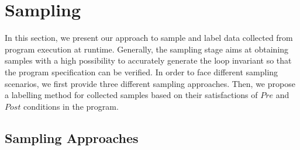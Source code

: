
\section{Sampling} %
\label{sec:sampling}

In this section, we present our approach to sample and label data 
collected from program execution at runtime. 
Generally, the sampling stage aims at obtaining samples with a high possibility to 
accurately generate the loop invariant so that the program specification can be verified. 
In order to face different sampling scenarios, 
we first provide three different sampling approaches. 
Then, we propose a labelling method for collected samples 
based on their satisfactions of $\mathit{Pre}$ and $\mathit{Post}$ conditions in the program. 

\subsection{Sampling Approaches} %
\label{sub:sampling_approaches}

